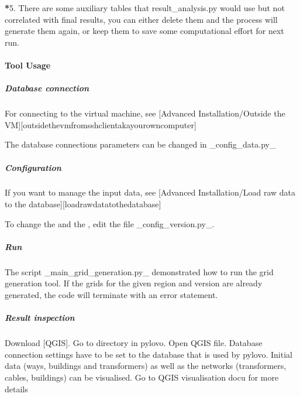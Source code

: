 \documentclass[letterpaper,10pt,english]{sphinxmanual}
\begin{document}
\sphinxAtStartPar
{\color{red}\bfseries{}*}5. There are some auxiliary tables that result\_analysis.py would use but not correlated with final results, you can
either delete them and the process will generate them again, or keep them to save some computational effort for next
run.

\sphinxstepscope


\paragraph{Tool Usage}
\label{\detokenize{grid_generation/usage/usage:tool-usage}}\label{\detokenize{grid_generation/usage/usage::doc}}

\subparagraph{Database connection}
\label{\detokenize{grid_generation/usage/usage:database-connection}}
\sphinxAtStartPar
For connecting to the virtual machine,
see {[}Advanced Installation/Outside the VM{]}{[}outside\sphinxhyphen{}the\sphinxhyphen{}vm\sphinxhyphen{}from\sphinxhyphen{}ssh\sphinxhyphen{}client\sphinxhyphen{}aka\sphinxhyphen{}your\sphinxhyphen{}own\sphinxhyphen{}computer{]}

\sphinxAtStartPar
The database connections parameters can be changed in \_config\_data.py\_


\subparagraph{Configuration}
\label{\detokenize{grid_generation/usage/usage:configuration}}
\sphinxAtStartPar
If you want to manage the input data,
see {[}Advanced Installation/Load raw data to the database{]}{[}load\sphinxhyphen{}raw\sphinxhyphen{}data\sphinxhyphen{}to\sphinxhyphen{}the\sphinxhyphen{}database{]}

\sphinxAtStartPar
To change the  and the , edit the file \_config\_version.py\_.


\subparagraph{Run}
\label{\detokenize{grid_generation/usage/usage:run}}
\sphinxAtStartPar
The script \_main\_grid\_generation.py\_ demonstrated how to run the grid generation tool.
If the grids for the given region and version are already generated, the code will terminate with an error statement.


\subparagraph{Result inspection}
\label{\detokenize{grid_generation/usage/usage:result-inspection}}
\sphinxAtStartPar
Download {[}QGIS{]}. Go to  directory in pylovo. Open QGIS file.
Database connection settings have to be set to the database that is used by pylovo.
Initial data (ways, buildings and transformers)
as well as the networks (transformers, cables, buildings) can be visualised.
Go to QGIS visualisation docu for more details
\end{document}

